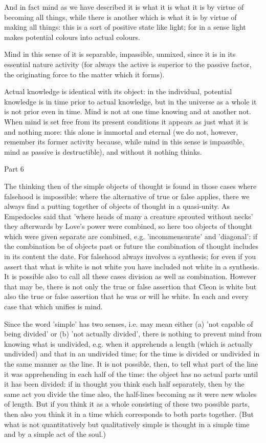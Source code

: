 And in fact mind as we have described it is what it is what it is
by virtue of becoming all things, while there is another which is
what it is by virtue of making all things: this is a sort of positive
state like light; for in a sense light makes potential colours into
actual colours. 

Mind in this sense of it is separable, impassible, unmixed, since
it is in its essential nature activity (for always the active is superior
to the passive factor, the originating force to the matter which it
forms). 

Actual knowledge is identical with its object: in the individual,
potential knowledge is in time prior to actual knowledge, but in the
universe as a whole it is not prior even in time. Mind is not at one
time knowing and at another not. When mind is set free from its present
conditions it appears as just what it is and nothing more: this alone
is immortal and eternal (we do not, however, remember its former activity
because, while mind in this sense is impassible, mind as passive is
destructible), and without it nothing thinks. 

Part 6

The thinking then of the simple objects of thought is found in those
cases where falsehood is impossible: where the alternative of true
or false applies, there we always find a putting together of objects
of thought in a quasi-unity. As Empedocles said that 'where heads
of many a creature sprouted without necks' they afterwards by Love's
power were combined, so here too objects of thought which were given
separate are combined, e.g. 'incommensurate' and 'diagonal': if the
combination be of objects past or future the combination of thought
includes in its content the date. For falsehood always involves a
synthesis; for even if you assert that what is white is not white
you have included not white in a synthesis. It is possible also to
call all these cases division as well as combination. However that
may be, there is not only the true or false assertion that Cleon is
white but also the true or false assertion that he was or will he
white. In each and every case that which unifies is mind.

Since the word 'simple' has two senses, i.e. may mean either (a) 'not
capable of being divided' or (b) 'not actually divided', there is
nothing to prevent mind from knowing what is undivided, e.g. when
it apprehends a length (which is actually undivided) and that in an
undivided time; for the time is divided or undivided in the same manner
as the line. It is not possible, then, to tell what part of the line
it was apprehending in each half of the time: the object has no actual
parts until it has been divided: if in thought you think each half
separately, then by the same act you divide the time also, the half-lines
becoming as it were new wholes of length. But if you think it as a
whole consisting of these two possible parts, then also you think
it in a time which corresponds to both parts together. (But what is
not quantitatively but qualitatively simple is thought in a simple
time and by a simple act of the soul.) 

